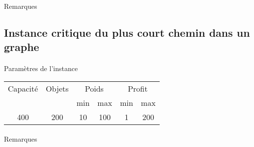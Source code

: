 \documentclass[12pt]{article}
\begin{document}
\paragraph{}Remarques

\subsection{Instance critique du plus court chemin dans un graphe}

\paragraph{}Paramètres de l'instance

\begin{tabular}{|c|c|c|c|c|c|}
	\hline
	Capacité & Objets & \multicolumn{2}{c|}{Poids} & \multicolumn{2}{c|}{Profit} \\
	\cline{3-6}
		& & min & max & min & max \\
	\hline
	400 & 200 & 10 & 100 & 1 & 200 \\
	\hline
\end{tabular}

\begin{figure}[!h]
\begin{floatrow}
\end{floatrow}
\end{figure}

\paragraph{}Remarques
\end{document}
